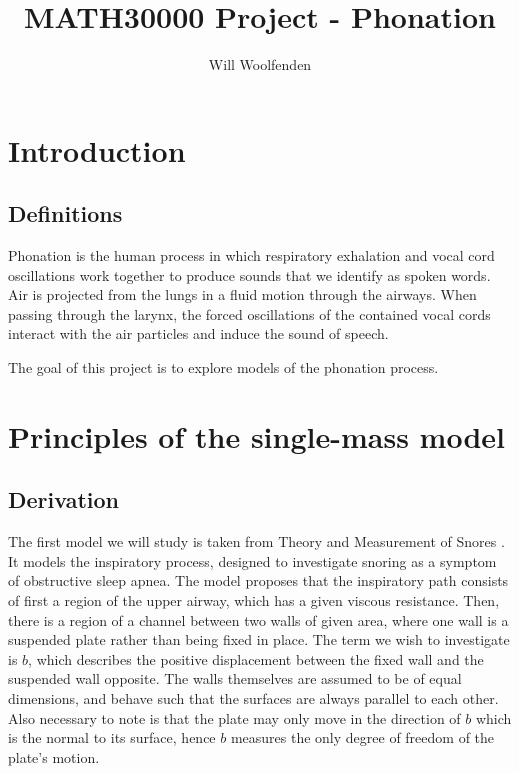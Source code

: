 \documentclass{article}
\title{MATH30000 Project - Phonation}
\author{Will Woolfenden}
\begin{document}
\maketitle

\section{Introduction}

\subsection{Definitions}

Phonation is the human process in which respiratory exhalation and vocal cord oscillations work together to produce sounds that we identify as spoken words.
Air is projected from the lungs in a fluid motion through the airways.
When passing through the larynx, the forced oscillations of the contained vocal cords interact with the air particles and induce the sound of speech.

The goal of this project is to explore models of the phonation process.



\section{Principles of the single-mass model}

\subsection{Derivation}


The first model we will study is taken from Theory and Measurement of Snores \cite{gavriely_jensen_1993}.
It models the inspiratory process, designed to investigate snoring as a symptom of obstructive sleep apnea.
The model proposes that the inspiratory path consists of first a region of the upper airway,
which has a given viscous resistance.
Then, there is a region of a channel between two walls of given area, where one wall is a suspended plate rather than being fixed in place.
The term we wish to investigate is $b$, which describes the positive displacement between the fixed wall and the suspended wall opposite.
The walls themselves are assumed to be of equal dimensions, and behave such that the surfaces are always parallel to each other.
Also necessary to note is that the plate may only move in the direction of $b$ which is the normal to its surface,
hence $b$ measures the only degree of freedom of the plate's motion.
\end{document}
